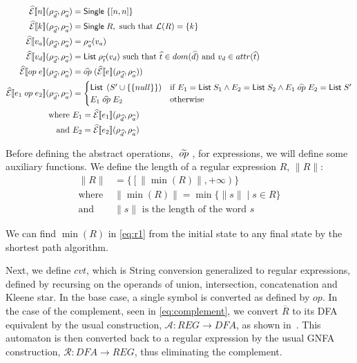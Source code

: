 \begin{align}\label{sem:exp1}
    \absexpsem{n}(\rho_{\ab{d}}, \rho_{\ab{a}}) &= \mathsf{Single} \; \{ [n, n] \} \\\label{sem:exp2}
    \absexpsem{k}(\rho_{\ab{d}}, \rho_{\ab{a}}) &= \mathsf{Single} \; R,  \text{ such that }\mathcal{L}(R) = \{ k \} \\ \label{sem:exp3}
    \absexpsem{v_a}(\rho_{\ab{d}}, \rho_{\ab{a}}) &=  \rho_{\ab{a}}(v_a) \\ \label{sem:exp4}
    \absexpsem{v_d}(\rho_{\ab{d}}, \rho_{\ab{a}}) &=  \mathsf{List} \; \rho_{\ab{t}}(v_d) \text{ such that } \ab{t} \in dom(\ab{d}) \text{ and } v_d \in attr(\ab{t}) \\ \label{eq:exp-lookup}
    \absexpsem{op \; e}(\rho_{\ab{d}}, \rho_{\ab{a}}) &= \ab{op} \; (\absexpsem{e}(\rho_{\ab{d}}, \rho_{\ab{a}})) \\ \label{eq:unary-op}
    \absexpsem{e_1 \;op\; e_2}(\rho_{\ab{d}}, \rho_{\ab{a}}) &=
    \begin{cases}
        \mathsf{List} \; \left(S' \cup \{\{null\}\} \right) & \text{if } E_1 = \mathsf{List} \; S_1 \land E_2 = \mathsf{List} \; S_2 \land E_1 \;\ab{op}\; E_2 = \mathsf{List} \; S'\\
        E_1 \;\ab{op}\; E_2 & \text{otherwise}\\
    \end{cases} \\
    \text{where } & E_1 = \absexpsem{e_1}(\rho_{\ab{d}}, \rho_{\ab{a}}) \\
    \text{and } & E_2 = \absexpsem{e_2}(\rho_{\ab{d}}, \rho_{\ab{a}})
\end{align}

Before defining the abstract operations, $\;\widetilde{op}\;$, for expressions, we will define some auxiliary functions.
We define the length of a regular expression $R$, $\|R\|$:
\begin{align}\label{eq:r1}
    \|R\| & = \{ \left[ \|\min(R)\|, +\infty \right) \} \\
    \text{where } & \|\min(R)\| = \min\{ \|s\| \mid s \in R \} \\ \label{eq:r2}
    \text{and } & \|s\| \text{ is the length of the word $s$}
\end{align}

We can find $\min(R)$ in \autoref{eq:r1} from the initial state to any final state by the shortest path algorithm.

Next, we define $cvt$, which is String conversion generalized to regular expressions, defined by recursing on the operands of union, intersection, concatenation and Kleene star.
In the base case, a single symbol is converted as defined by $op$.
In the case of the complement, seen in \autoref{eq:complement}, we convert $\overline{R}$ to its DFA equivalent by the usual construction, $\mathcal{A}:REG\rightarrow DFA$, as shown in~\cite{sipserbook}.
This automaton is then converted back to a regular expression by the usual GNFA construction, $\mathcal{R}: DFA\rightarrow REG$, thus eliminating the complement. 


